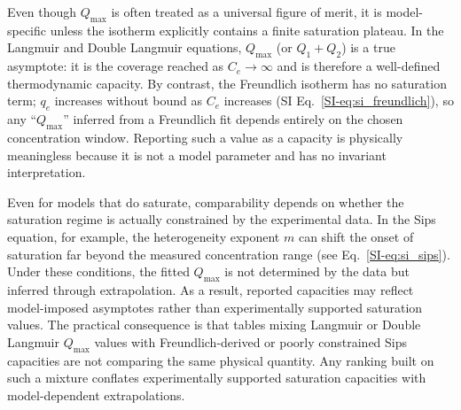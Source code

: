 \documentclass[journal=jacsat,manuscript=article]{achemso}
\begin{document}

Even though $Q_{\max}$ is often treated as a universal figure of merit, it is
model-specific unless the isotherm explicitly contains a finite saturation
plateau. In the Langmuir and Double Langmuir equations, $Q_{\max}$ (or
$Q_1 + Q_2$) is a true asymptote: it is the coverage reached as $C_e \to \infty$
and is therefore a well-defined thermodynamic capacity. By contrast, the
Freundlich isotherm has no saturation term; $q_e$ increases without bound as
$C_e$ increases (SI Eq.~\eqref{SI-eq:si_freundlich}), so any ``$Q_{\max}$''
inferred from a Freundlich fit depends
entirely on the chosen concentration window. Reporting such a value as a
capacity is physically meaningless because it is not a model parameter and has
no invariant interpretation.


Even for models that do saturate, comparability depends on whether the saturation regime is actually constrained by the experimental data. In the Sips equation, for example, the heterogeneity exponent $m$ can shift the onset of saturation far beyond the measured concentration range (see Eq.~\ref{SI-eq:si_sips}). Under these conditions, the fitted $Q_{\max}$ is not determined by the data but inferred through extrapolation. As a result, reported capacities may reflect model-imposed asymptotes rather than experimentally supported saturation values. The practical consequence is that tables mixing Langmuir or Double Langmuir $Q_{\max}$ values with Freundlich-derived or poorly constrained Sips capacities are not comparing the same physical quantity. Any ranking built on such a mixture conflates experimentally supported saturation capacities with model-dependent extrapolations.
\end{document}
